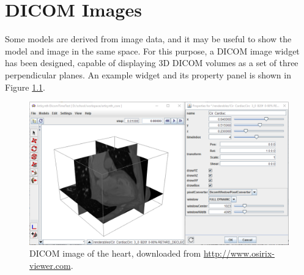 
\let\olditem\item
\newcommand{\lstitem}[2][]{\olditem[{\protect\texttt{#1}}]\mbox{}\newline#2}
\newenvironment{lstdescription}{%
   \iflatexml
   \begin{description}
   \else
   \begin{description}[nolistsep]
   \fi
   \let\item\lstitem
}{\end{description}}

\newenvironment{tightemize}{%
   \iflatexml
   \begin{itemize}
   \else
   \begin{itemize}[nolistsep,noitemsep]
   \fi
}{\end{itemize}}


\chapter{DICOM Images}
\label{sec:dicom}

Some models are derived from image data, and it may be useful to show the model
and image in the same space.  For this purpose, a DICOM image widget has been designed,
capable of displaying 3D DICOM volumes as a set of three perpendicular planes.  An
example widget and its property panel is shown in Figure \ref{fig:dicom:heart}.

\begin{figure}[!ht]
   \begin{center}
      \includegraphics[width=\imglength]{images/dicom_heart}
      \caption{DICOM image of the heart, 
      downloaded from \url{http://www.osirix-viewer.com}. \label{fig:dicom:heart}}
   \end{center}
\end{figure}

